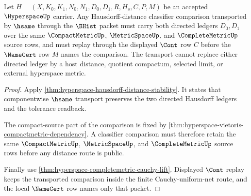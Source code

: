 \begin{theorem}
\label{thm:hyperspace-hausdorff-classifier-transport}
Let $H=(X,K_0,K_1,N_0,N_1,D_0,D_1,R,H_s,C,P,M)$ be an accepted $\HyperspaceUp$ carrier. Any Hausdorff-distance classifier comparison transported by $\hsame$ through the $\BHist$ packet must carry both directed ledgers $D_0,D_1$ over the same $\CompactMetricUp$, $\MetricSpaceUp$, and $\CompleteMetricUp$ source rows, and must replay through the displayed $\Cont$ row $C$ before the $\NameCert$ row $M$ names the comparison. The transport cannot replace either directed ledger by a host distance, quotient compactum, selected limit, or external hyperspace metric.
\end{theorem}
\begin{proof}
Apply \autoref{thm:hyperspace-hausdorff-distance-stability}. It states that componentwise $\hsame$ transport preserves the two directed Hausdorff ledgers and the tolerance readback.

The compact-source part of the comparison is fixed by \autoref{thm:hyperspace-vietoris-compactmetric-dependency}. A classifier comparison must therefore retain the same $\CompactMetricUp$, $\MetricSpaceUp$, and $\CompleteMetricUp$ source rows before any distance route is public.

Finally use \autoref{thm:hyperspace-completemetric-cauchy-lift}. Displayed $\Cont$ replay keeps the transported comparison inside the finite Cauchy-uniform-net route, and the local $\NameCert$ row names only that packet.
\end{proof}

